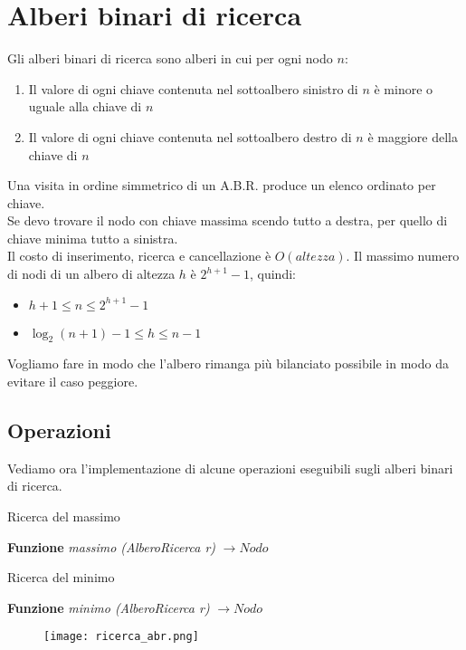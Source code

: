 \section{Alberi binari di ricerca}
Gli alberi binari di ricerca sono alberi in cui per ogni nodo $n$: 
\begin{enumerate}
    \item Il valore di ogni chiave contenuta nel sottoalbero sinistro di $n$ è minore o uguale alla chiave di $n$
    \item Il valore di ogni chiave contenuta nel sottoalbero destro di $n$ è maggiore della chiave di $n$
\end{enumerate}
Una visita in ordine simmetrico di un A.B.R. produce un elenco ordinato per chiave.\\
Se devo trovare il nodo con chiave massima scendo tutto a destra, per quello di chiave minima tutto a sinistra.\\
Il costo di inserimento, ricerca e cancellazione è $O(altezza)$.
Il massimo numero di nodi di un albero di altezza $h$ è $2^{h+1}-1$, quindi:
\begin{itemize}
    \item $h + 1 \le n \le 2^{h+1}-1$
    \item $\log_2(n+1) - 1 \le h \le n - 1$
\end{itemize}
Vogliamo fare in modo che l'albero rimanga più bilanciato possibile in modo
da evitare il caso peggiore.

\subsection{Operazioni}
Vediamo ora l'implementazione di alcune operazioni eseguibili sugli alberi binari di ricerca.
\begin{algorithm}
    \caption{Ricerca del massimo}
    \Indm\textbf{Funzione} \emph{massimo (AlberoRicerca r)} $\rightarrow Nodo$\\
    \Indp{}
\end{algorithm}

\begin{algorithm}
    \caption{Ricerca del minimo}
    \Indm\textbf{Funzione} \emph{minimo (AlberoRicerca r)} $\rightarrow Nodo$\\
    \Indp{}
\end{algorithm}
\clearpage
\begin{figure}[h]
    \texttt{[image: ricerca\_abr.png]}
\end{figure}


